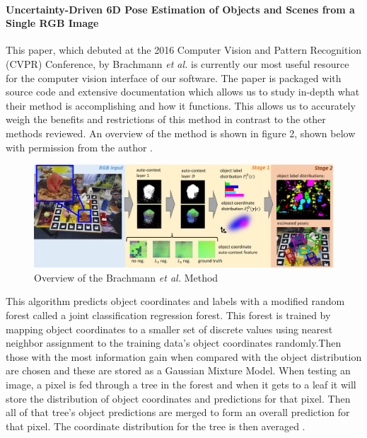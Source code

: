 \documentclass[12pt]{article}
\begin{document}
\paragraph{Uncertainty-Driven 6D Pose Estimation of Objects and Scenes
from a Single RGB
Image}\label{uncertainty-driven-6d-pose-estimation-of-objects-and-scenes-from-a-single-rgb-image}

This paper, which debuted at the 2016 Computer Vision and Pattern
Recognition (CVPR) Conference, by Brachmann \emph{et al.} is currently
our most useful resource for the computer vision interface of our
software. The paper is packaged with source code and extensive
documentation which allows us to study in-depth what their method is
accomplishing and how it functions. This allows us to accurately weigh
the benefits and restrictions of this method in contrast to the other
methods reviewed. An overview of the method is shown in figure 2, shown
below with permission from the author \autocite{brachmann}.

\begin{figure}
\centering
\includegraphics{Pictures/figure2.png}
\caption{Overview of the Brachmann \emph{et al.} Method}
\end{figure}

This algorithm predicts object coordinates and labels with a modified
random forest called a joint classification regression forest. This
forest is trained by mapping object coordinates to a smaller set of
discrete values using nearest neighbor assignment to the training data's
object coordinates randomly.Then those with the most information gain
when compared with the object distribution are chosen and these are
stored as a Gaussian Mixture Model. When testing an image, a pixel is
fed through a tree in the forest and when it gets to a leaf it will
store the distribution of object coordinates and predictions for that
pixel. Then all of that tree's object predictions are merged to form an
overall prediction for that pixel. The coordinate distribution for the
tree is then averaged \autocite{brachmann}.
\end{document}
